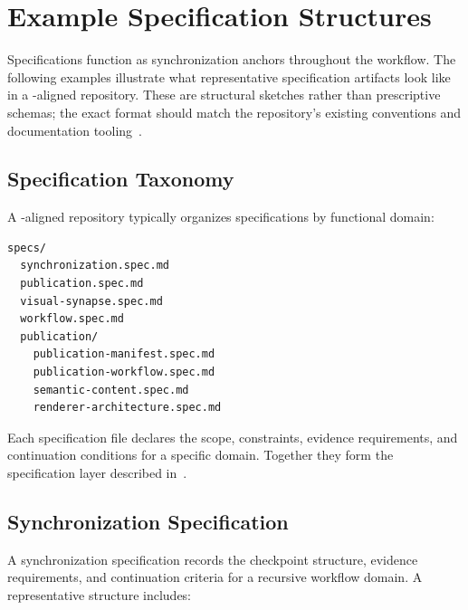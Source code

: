 
\section{Example Specification Structures}
\label{sec:appendix-specs}

Specifications function as synchronization anchors throughout the  workflow. The following examples illustrate what representative specification artifacts look like in a -aligned repository. These are structural sketches rather than prescriptive schemas; the exact format should match the repository's existing conventions and documentation tooling~\cite{Parnas1972Modularization}.

\subsection{Specification Taxonomy}

A -aligned repository typically organizes specifications by functional domain:

\begin{lstlisting}[language=bash, caption={Example specification directory structure.}, label={lst:spec-dir}]
specs/
  synchronization.spec.md
  publication.spec.md
  visual-synapse.spec.md
  workflow.spec.md
  publication/
    publication-manifest.spec.md
    publication-workflow.spec.md
    semantic-content.spec.md
    renderer-architecture.spec.md
\end{lstlisting}

Each specification file declares the scope, constraints, evidence requirements, and continuation conditions for a specific domain. Together they form the specification layer described in~.

\subsection{Synchronization Specification}

A synchronization specification records the checkpoint structure, evidence requirements, and continuation criteria for a recursive workflow domain. A representative structure includes:

